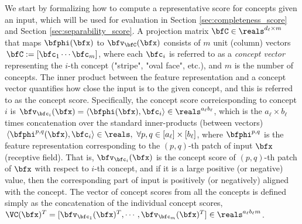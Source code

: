 We start by formalizing how to compute a representative score for concepts given an input, which will be used for evaluation in Section \ref{sec:completeness_score} and Section \ref{sec:separability_score}.
A projection matrix $\bfC \in \reals^{d_\ell \times m}$ that maps $\bfphi(\bfx)$ to $\bfv_{\bfC}(\bfx)$ consists of $m$ unit (column) vectors $\,\bfC := [\bfc_1 \cdots \bfc_m]$, where each $\bfc_i$ is referred to as a \textit{concept vector} representing the $i$-th concept (\eg "stripe", "oval face", etc.), and $m$ is the number of concepts.
The inner product between the feature representation and a concept vector quantifies how close the input is to the given concept, and this is referred to as the concept score. 
Specifically, the concept score correicsponding to concept $i$ is $\bfv_{\bfc_i}(\bfx) = \langle \bfphi(\bfx), \bfc_i \rangle \in \reals^{a_\ell b_\ell}$, which is the $a_\ell \times b_\ell$ times concatenation over the standard inner-products (between vectors) $\,\langle \bfphi^{p,q}(\bfx), \bfc_i \rangle \in \reals, ~\forall p, q \in [a_\ell] \times [b_\ell]$, where $\bfphi^{p,q}$ is the feature representation corresponding to the $(p, q)$-th patch of input $\bfx$ (\ie receptive field).
That is, $\bfv_{\bfc_i}(\bfx)$  is the concept score of $(p, q)$-th patch of $\bfx$ with respect to $i$-th concept, and if it is a large positive (or negative) value, then the corresponding part of input is positively (or negatively) aligned with the concept.
The vector of concept scores from all the concepts is defined simply as the concatenation of the individual concept scores, \ie $\VC(\bfx)^T = [\bfv_{\bfc_1}(\bfx)^T, \cdots, \bfv_{\bfc_m}(\bfx)^T] \in \reals^{a_\ell b_\ell m}$.

